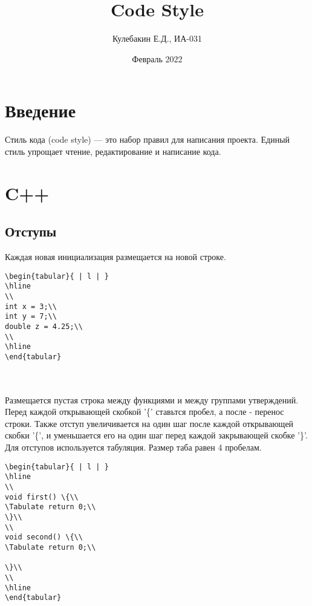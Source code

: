 \documentclass{article}
\title{Code Style}
\author{Кулебакин Е.Д., ИА-031}
\affil{email: geka\_kule@mail.ru,  github: @Jencik4}
\date{Февраль 2022}
\begin{document}
\maketitle

\section{Введение}
Стиль кода (code style) — это набор правил для написания проекта. Единый стиль упрощает чтение, редактирование и написание кода.

\section{C++\cite{CPP}}
\subsection{Отступы\cite{one}}

Каждая новая инициализация размещается на новой строке.\\

\newcommand*{\Tabulate}{\hspace*{0.5cm}}
\begin{lstlisting}
\begin{tabular}{ | l | }
\hline
\\
int x = 3;\\
int y = 7;\\
double z = 4.25;\\
\\
\hline
\end{tabular}
\end{lstlisting}
\\\\
Размещается пустая строка между функциями и между группами утверждений.\\
Перед каждой открывающей скобкой '\{' ставьтся пробел, а после - перенос строки.
Также отступ увеличивается на один шаг после каждой открывающей скобки '\{', и уменьшается его на один шаг перед каждой закрывающей скобке '\}'. \\
Для отступов используется табуляция. Размер таба равен 4 пробелам.\\

\begin{lstlisting}
\begin{tabular}{ | l | }
\hline
\\
void first() \{\\
\Tabulate return 0;\\
\}\\
\\
void second() \{\\
\Tabulate return 0;\\

\}\\
\\
\hline
\end{tabular}
\end{lstlisting}
\end{document}
